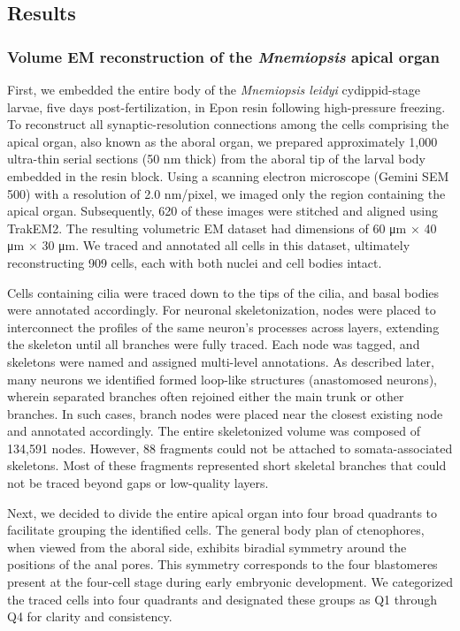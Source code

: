 \documentclass[
  11pt,
]{article}
\begin{document}
\subsection{Results}\label{results}

\subsubsection{\texorpdfstring{Volume EM reconstruction of the
\emph{Mnemiopsis} apical
organ}{Volume EM reconstruction of the Mnemiopsis apical organ}}\label{volume-em-reconstruction-of-the-mnemiopsis-apical-organ}

First, we embedded the entire body of the \emph{Mnemiopsis leidyi}
cydippid-stage larvae, five days post-fertilization, in Epon resin
following high-pressure freezing. To reconstruct all synaptic-resolution
connections among the cells comprising the apical organ, also known as
the aboral organ, we prepared approximately 1,000 ultra-thin serial
sections (50 nm thick) from the aboral tip of the larval body embedded
in the resin block. Using a scanning electron microscope (Gemini SEM
500) with a resolution of 2.0 nm/pixel, we imaged only the region
containing the apical organ. Subsequently, 620 of these images were
stitched and aligned using TrakEM2. The resulting volumetric EM dataset
had dimensions of 60 μm × 40 μm × 30 μm. We traced and annotated all
cells in this dataset, ultimately reconstructing 909 cells, each with
both nuclei and cell bodies intact.

Cells containing cilia were traced down to the tips of the cilia, and
basal bodies were annotated accordingly. For neuronal skeletonization,
nodes were placed to interconnect the profiles of the same neuron's
processes across layers, extending the skeleton until all branches were
fully traced. Each node was tagged, and skeletons were named and
assigned multi-level annotations. As described later, many neurons we
identified formed loop-like structures (anastomosed neurons), wherein
separated branches often rejoined either the main trunk or other
branches. In such cases, branch nodes were placed near the closest
existing node and annotated accordingly. The entire skeletonized volume
was composed of 134,591 nodes. However, 88 fragments could not be
attached to somata-associated skeletons. Most of these fragments
represented short skeletal branches that could not be traced beyond gaps
or low-quality layers.

Next, we decided to divide the entire apical organ into four broad
quadrants to facilitate grouping the identified cells. The general body
plan of ctenophores, when viewed from the aboral side, exhibits biradial
symmetry around the positions of the anal pores. This symmetry
corresponds to the four blastomeres present at the four-cell stage
during early embryonic development. We categorized the traced cells into
four quadrants and designated these groups as Q1 through Q4 for clarity
and consistency.
\end{document}
